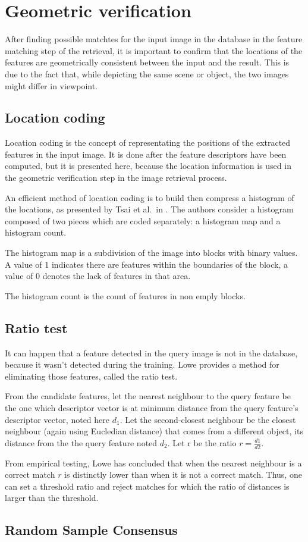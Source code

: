 \section{Geometric verification}
\label{sec:geometric_verification}

After finding possible matchtes for the input image in the database in the feature matching step of the retrieval, it is important to confirm that the locations of the features are geometrically consistent between the input and the result. This is due to the fact that, while depicting the same scene or object, the two images might differ in viewpoint.

\subsection{Location coding}

Location coding is the concept of representating the positions of the extracted features in the input image. It is done after the feature descriptors have been computed, but it is presented here, because the location information is used in the geometric verification step in the image retrieval process.

An efficient method of location coding is to build then compress a histogram of the locations, as presented by Tsai et al.\ in \cite{tsai2010fast}. The authors consider a histogram composed of two pieces which are coded separately: a histogram map and a histogram count.

The histogram map is a subdivision of the image into blocks with binary values. A value of 1 indicates there are features within the boundaries of the block, a value of 0 denotes the lack of features in that area.

The histogram count is the count of features in non emply blocks.

\subsection{Ratio test}

It can happen that a feature detected in the query image is not in the database, because it wasn't detected during the training. Lowe \cite{Lowe04distinctiveimage} provides a method for eliminating those features, called the ratio test.

From the candidate features, let the nearest neighbour to the query feature be the one which descriptor vector is at minimum distance from the query feature's descriptor vector, noted here $d_1$. Let the second-closest neighbour be the closest neighbour (again using Eucledian distance) that comes from a different object, its distance from the the query feature noted $d_2$. Let r be the ratio $r = \frac{d1}{d2}$.

From empirical testing, Lowe has concluded that when the nearest neighbour is a correct match $r$ is distinctly lower than when it is not a correct match. Thus, one can set a threshold ratio and reject matches for which the ratio of distances is larger than the threshold.


\subsection{Random Sample Consensus}
